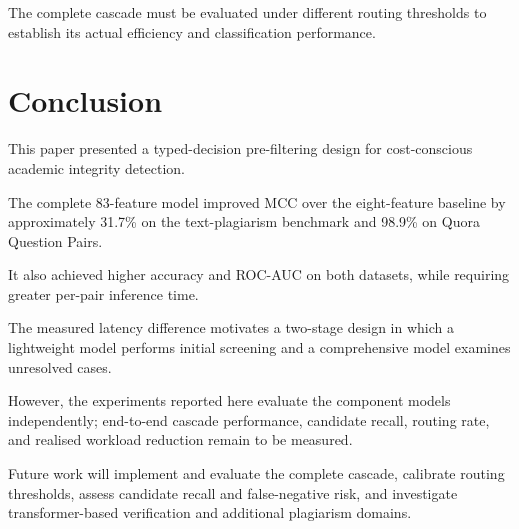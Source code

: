 \documentclass[conference]{IEEEtran}
\begin{document}
The complete cascade must be evaluated under different
routing thresholds to establish its actual efficiency and
classification performance.


\section{Conclusion}

This paper presented a typed-decision pre-filtering design
for cost-conscious academic integrity detection.

The complete 83-feature model improved MCC over the
eight-feature baseline by approximately 31.7\% on the
text-plagiarism benchmark and 98.9\% on Quora Question
Pairs.

It also achieved higher accuracy and ROC-AUC on both
datasets, while requiring greater per-pair inference time.

The measured latency difference motivates a two-stage
design in which a lightweight model performs initial
screening and a comprehensive model examines unresolved
cases.

However, the experiments reported here evaluate the
component models independently; end-to-end cascade
performance, candidate recall, routing rate, and realised
workload reduction remain to be measured.

Future work will implement and evaluate the complete
cascade, calibrate routing thresholds, assess candidate
recall and false-negative risk, and investigate
transformer-based verification and additional plagiarism
domains.

\end{document}
